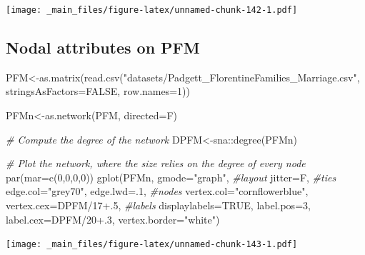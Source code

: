\documentclass[
  notitlepage,
  onecolumn,
  openany]{book}
\newenvironment{Shaded}{\begin{snugshade}}{\end{snugshade}}
\newcommand{\AttributeTok}[1]{\textcolor[rgb]{0.77,0.63,0.00}{#1}}
\newcommand{\CommentTok}[1]{\textcolor[rgb]{0.56,0.35,0.01}{\textit{#1}}}
\newcommand{\ConstantTok}[1]{\textcolor[rgb]{0.00,0.00,0.00}{#1}}
\newcommand{\DecValTok}[1]{\textcolor[rgb]{0.00,0.00,0.81}{#1}}
\newcommand{\FloatTok}[1]{\textcolor[rgb]{0.00,0.00,0.81}{#1}}
\newcommand{\FunctionTok}[1]{\textcolor[rgb]{0.00,0.00,0.00}{#1}}
\newcommand{\NormalTok}[1]{#1}
\newcommand{\OtherTok}[1]{\textcolor[rgb]{0.56,0.35,0.01}{#1}}
\newcommand{\SpecialCharTok}[1]{\textcolor[rgb]{0.00,0.00,0.00}{#1}}
\newcommand{\StringTok}[1]{\textcolor[rgb]{0.31,0.60,0.02}{#1}}
\begin{document}
\texttt{[image: \_main\_files/figure-latex/unnamed-chunk-142-1.pdf]}

\hypertarget{nodal-attributes-on-pfm}{%
\subsection{Nodal attributes on PFM}\label{nodal-attributes-on-pfm}}

\begin{Shaded}
\begin{Highlighting}[]
\NormalTok{PFM}\OtherTok{\textless{}{-}}\FunctionTok{as.matrix}\NormalTok{(}\FunctionTok{read.csv}\NormalTok{(}\StringTok{"datasets/Padgett\_FlorentineFamilies\_Marriage.csv"}\NormalTok{,}
                        \AttributeTok{stringsAsFactors=}\ConstantTok{FALSE}\NormalTok{, }\AttributeTok{row.names=}\DecValTok{1}\NormalTok{))}

\NormalTok{PFMn}\OtherTok{\textless{}{-}}\FunctionTok{as.network}\NormalTok{(PFM, }\AttributeTok{directed=}\NormalTok{F)}

\CommentTok{\# Compute the degree of the network}
\NormalTok{DPFM}\OtherTok{\textless{}{-}}\NormalTok{sna}\SpecialCharTok{::}\FunctionTok{degree}\NormalTok{(PFMn)}

\CommentTok{\# Plot the network, where the size relies on the degree of every node}
\FunctionTok{par}\NormalTok{(}\AttributeTok{mar=}\FunctionTok{c}\NormalTok{(}\DecValTok{0}\NormalTok{,}\DecValTok{0}\NormalTok{,}\DecValTok{0}\NormalTok{,}\DecValTok{0}\NormalTok{))}
\FunctionTok{gplot}\NormalTok{(PFMn, }
      \AttributeTok{gmode=}\StringTok{"graph"}\NormalTok{, }
      \CommentTok{\#layout}
      \AttributeTok{jitter=}\NormalTok{F,}
      \CommentTok{\#ties}
      \AttributeTok{edge.col=}\StringTok{"grey70"}\NormalTok{,}
      \AttributeTok{edge.lwd=}\NormalTok{.}\DecValTok{1}\NormalTok{, }
      \CommentTok{\#nodes}
      \AttributeTok{vertex.col=}\StringTok{"cornflowerblue"}\NormalTok{,}
      \AttributeTok{vertex.cex=}\NormalTok{DPFM}\SpecialCharTok{/}\DecValTok{17}\FloatTok{+.5}\NormalTok{,}
      \CommentTok{\#labels}
      \AttributeTok{displaylabels=}\ConstantTok{TRUE}\NormalTok{, }
      \AttributeTok{label.pos=}\DecValTok{3}\NormalTok{, }
      \AttributeTok{label.cex=}\NormalTok{DPFM}\SpecialCharTok{/}\DecValTok{20}\FloatTok{+.3}\NormalTok{, }
      \AttributeTok{vertex.border=}\StringTok{"white"}\NormalTok{)}
\end{Highlighting}
\end{Shaded}

\texttt{[image: \_main\_files/figure-latex/unnamed-chunk-143-1.pdf]}
\end{document}
